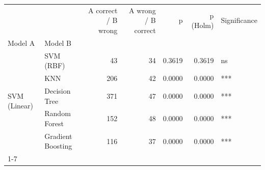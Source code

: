 \begin{table}
\label{tab:Ext03_mcnemar_vs_linear_svm}
\begin{tabular}{llrrrrl}
\toprule
 &  & A correct / B wrong & A wrong / B correct & p & p (Holm) & Significance \\
Model A & Model B &  &  &  &  &  \\
\midrule
\multirow[t]{5}{*}{SVM (Linear)} & SVM (RBF) & 43 & 34 & 0.3619 & 0.3619 & ns \\
 & KNN & 206 & 42 & 0.0000 & 0.0000 & *** \\
 & Decision Tree & 371 & 47 & 0.0000 & 0.0000 & *** \\
 & Random Forest & 152 & 48 & 0.0000 & 0.0000 & *** \\
 & Gradient Boosting & 116 & 37 & 0.0000 & 0.0000 & *** \\
\cline{1-7}
\bottomrule
\end{tabular}
\end{table}
